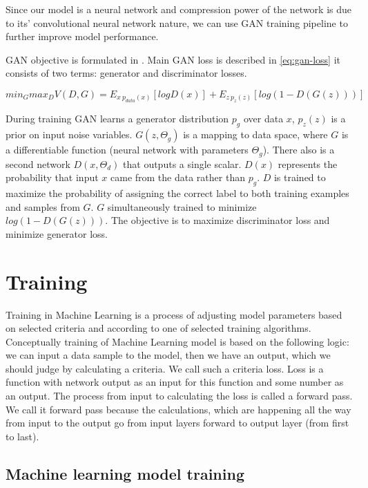 Since our model is a neural network and compression power of the network is due to its' convolutional neural network nature, we can use GAN training pipeline to further improve model performance.

GAN objective is formulated in \cite{Goodfellow_Pouget-Abadie_Mirza_Xu_Warde-Farley_Ozair_Courville_Bengio_2014}. Main GAN loss is described in \ref{eq:gan-loss} it consists of two terms: generator and discriminator losses.

\begin{equation}
    \label{eq:gan-loss}
    min_G max_D V(D, G) = E_{x~p_{data}(x)} [log D(x)] + E_{z~p_z(z)} [log(1 - D(G(z)))]
\end{equation}

During training GAN learns a generator distribution $p_g$ over data $x$, $p_z(z)$ is a prior on input noise variables. $G(z, \Theta_g)$ is a mapping to data space, where $G$ is a differentiable function (neural network with parameters $\Theta_g$). There also is a second network $D(x, \Theta_d)$ that outputs a single scalar. $D(x)$ represents the probability that input $x$ came from the data rather than $p_g$. $D$ is trained to maximize the probability of assigning the correct label to both training examples and samples from $G$. $G$ simultaneously trained to minimize $log(1 − D(G(z)))$. The objective is to maximize discriminator loss and minimize generator loss.

\section{Training}

Training in Machine Learning is a process of adjusting model parameters based on selected criteria and according to one of selected training algorithms. Conceptually training of Machine Learning model is based on the following logic: we can input a data sample to the model, then we have an output, which we should judge by calculating a criteria. We call such a criteria loss. Loss is a function with network output as an input for this function and some number as an output. The process from input to calculating the loss is called a forward pass. We call it forward pass because the calculations, which are happening all the way from input to the output go from input layers forward to output layer (from first to last).

\subsection{Machine learning model training}


